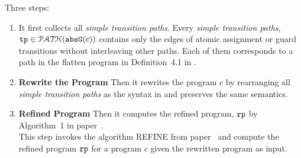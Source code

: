 Three steps:
\begin{enumerate}
  \item It first collects all \emph{simple transition paths}.
  Every \emph{simple transition paths}, $\mathtt{tp} \in \mathcal{PATH}(\mathtt{abs}{\mathtt{G}}(c))$ 
  contains only the edges of atomic assignment or guard transitions without interleaving other paths.
  Each of them corresponds to a path in the flatten program in Definition~4.1 in \cite{GulwaniJK09}.
%
    \item \textbf{Rewrite the Program}
    Then it rewrites the program $c$ by rearranging all \emph{simple transition paths} as the syntax in \cite{GulwaniJK09} and preserves the same semantics.
\item \textbf{Refined Program}
Then it computes the 
refined program, $\mathtt{rp}$ by Algorithm~1 in paper~\cite{GulwaniJK09}.
\\
This step invokes the algorithm REFINE from paper~\cite{GulwaniJK09} and compute the 
refined program $\mathtt{rp}$ for a program $c$ given the rewritten program as input.
\end{enumerate}

